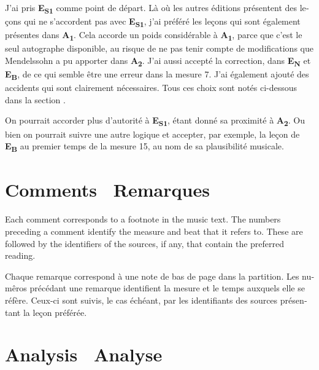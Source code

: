\documentclass[a4paper, 12pt]{book}
\newcommand{\source}[2]{\textbf{#1\textsubscript{#2}}}
\newcommand{\bigdot}[0]{{\Large \textbullet}}
\newcommand{\centerbigdot}[0]{\begin{center}\bigdot\end{center}}
\begin{document}
{\begin{otherlanguage}{french}
    J'ai pris \source{E}{S1} comme point de départ. Là où les autres
    éditions présentent des leçons qui ne s'accordent pas avec
    \source{E}{S1}, j'ai préféré les leçons qui sont également
    présentes dans \source{A}{1}. Cela accorde un poids considérable
    à \source{A}{1}, parce que c'est le seul autographe disponible, au
    risque de ne pas tenir compte de modifications que Mendelssohn a
    pu apporter dans \source{A}{2}.  J'ai aussi accepté la correction,
    dans \source{E}{N} et \source{E}{B}, de ce qui semble être une
    erreur dans la mesure 7. J'ai également ajouté des accidents qui
    sont clairement nécessaires. Tous ces choix sont notés ci-dessous
    dans la section .

    On pourrait accorder plus d'autorité à \source{E}{S1}, étant donné
    sa proximité à \source{A}{2}. Ou bien on pourrait suivre une autre
    logique et accepter, par exemple, la leçon de \source{E}{B} au
    premier temps de la mesure 15, au nom de sa plausibilité musicale.
    \end{otherlanguage}
    
    \section*{Comments \bigdot\ \foreignlanguage{french}{Remarques}}
    \label{sec:comments}

    Each comment corresponds to a footnote in the music text. The
    numbers preceding a comment identify the measure and beat that
    it refers to.  These are followed by the identifiers of the
    sources, if any, that contain the preferred reading.
    
    \centerbigdot

    \begin{otherlanguage}{french}
      Chaque remarque correspond à une note de bas de page dans la
      partition. Les numêros précédant une remarque identifient la
      mesure et le temps auxquels elle se réfère. Ceux-ci sont suivis,
      le cas échéant, par les identifiants des sources présentant la
      leçon préférée.
    \end{otherlanguage}

    

    \section*{Analysis \bigdot\ Analyse}
    \label{sec:analysis}

}
\end{document}

